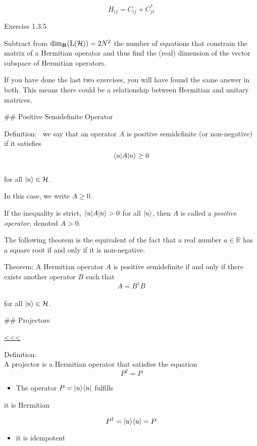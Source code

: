 \documentclass[11pt]{article}
\providecommand{\tightlist}{%
      \setlength{\itemsep}{0pt}\setlength{\parskip}{0pt}}
\begin{document}
\[
H_{ij} = C_{ij} + C_{ji}^*
\]

    Exercise 1.3.5

Subtract from \({\rm dim}_{\bf R}({\rm L}({\cal H})) =  2N^2\) the number of
equations that constrain the matrix of a Hermitian operator and thus
find the (real) dimension of the vector subspace of Hermitian operators.

    If you have done the last two exercises, you will have found the same
answer in both. This means there could be a relationship between
Hermitian and unitary matrices.

    \#\# Positive Semidefinite Operator

Definition: \(~\) we say that an operator \(A\) is positive semidefinite
(or non-negative) if it satisfies \\
\[
\langle u| A |u\rangle \geq 0 
\]\\
for all \(|u\rangle \in {\cal H}\).

In this case, we write \(A \geq 0\).

    If the inequality is strict, \(\langle u| A |u\rangle > 0\) for all
\(|u\rangle\), then \(A\) is called a \emph{positive operator}, denoted
\(A > 0\).

    The following theorem is the equivalent of the fact that a real number
\(a \in \mathbb{R}\) has a square root if and only if it is
non-negative.

Theorem: A Hermitian operator \(A\) is positive semidefinite if and only
if there exists another operator \(B\) such that \[   
A = B^\dagger B
\]\\
for all \(|u\rangle \in {\cal H}\).

    \#\# Projectors

\hyperref[top]{<<<}

    Definition:\\
A projector is a Hermitian operator that satisfies the equation \[
P^2 = P
\]

    \begin{itemize}
\tightlist
\item
  The operator \(P = | u\rangle \langle u|\) fulfills
\end{itemize}

it is Hermitian

\[
P^\dagger = | u\rangle \langle u| = P
\]

    \begin{itemize}
\tightlist
\item
  it is idempotent
\end{itemize}
\end{document}
